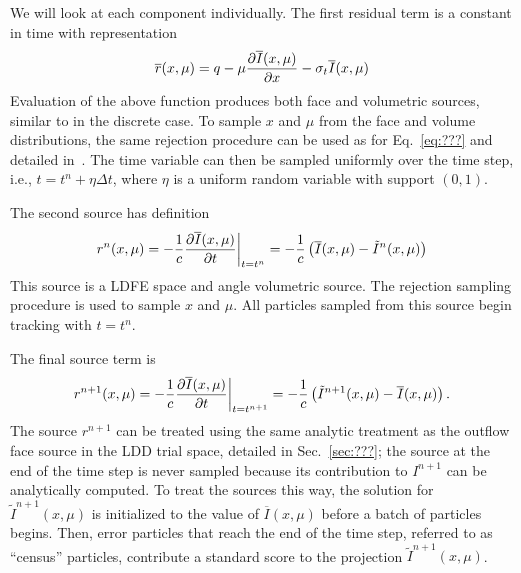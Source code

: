 We will look at each component individually.  
The first residual term is a constant in time with representation
\begin{equation}
    \overline r(x,\mu) = q  - \mu \frac{\partial \overline I(x,\mu)}{\partial x} - \sigma_t \overline
    I(x,\mu)
\end{equation}
Evaluation of the above function produces both face and volumetric sources, similar to in
the discrete case.  To sample $x$ and $\mu$ from the face and volume distributions, the same rejection procedure
can be used as for Eq.~\eqref{eq:???} and detailed in~\cite{jake}.    The
time variable can then be sampled uniformly over the time step, i.e., $t=t^n + \eta \Delta
t$, where $\eta$ is a uniform random variable with support $(0,1)$.

The second source has definition
\begin{equation}
    r^{n}(x,\mu) = -\frac{1}{c}\frac{\partial \overline{I}(x,\mu)}{\partial t}\bigg|_{t=t^{n}}
    =-\frac{1}{c}\left(\overline I(x,\mu) - \tilde I^{n}(x,\mu)\right)
\end{equation}
This source is a LDFE space and angle volumetric source.
The rejection sampling procedure is used to sample $x$ and $\mu$.
All particles sampled from this source begin tracking with $t=t^{n}$.

The final source term is
\begin{equation}
    r^{n+1}(x,\mu) = -\frac{1}{c}\frac{\partial \overline{I}(x,\mu)}{\partial t}\bigg|_{t=t^{n+1}}
    =-\frac{1}{c}\left(\tilde I^{n+1}(x,\mu) - \overline I(x,\mu)\right).
\end{equation}
The source $r^{n+1}$ can be treated using the
same analytic treatment as the outflow face source in the LDD
trial space, detailed in Sec.~\ref{sec:???}; the source at the end of the time step is never sampled because its
contribution to $I^{n+1}$ can be analytically computed.  To treat the sources this way, the solution for $\tilde I^{n+1}(x,\mu)$ is
initialized to the value of $\overline I(x,\mu)$ before a batch of particles begins.
Then, error particles that reach the end of the time step, referred to as ``census''
particles, contribute a standard score to the projection $\tilde I^{n+1}(x,\mu)$.

